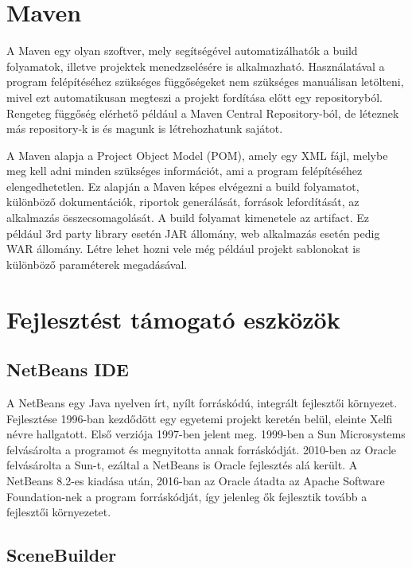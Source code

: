 \section{Maven}

A Maven egy olyan szoftver, mely segítségével automatizálhatók a build folyamatok, illetve projektek menedzselésére is alkalmazható.\cite{maven1}
Használatával a program felépítéséhez szükséges függőségeket nem szükséges manuálisan letölteni, mivel ezt automatikusan megteszi a projekt fordítása előtt egy repositoryból.
Rengeteg függőség elérhető például a Maven Central Repository-ból, de léteznek más repository-k is és magunk is létrehozhatunk sajátot. 

A Maven alapja a Project Object Model (POM), amely egy XML fájl, melybe meg kell adni minden szükséges információt, ami a program felépítéséhez elengedhetetlen.
Ez alapján a Maven képes elvégezni a build folyamatot, különböző dokumentációk, riportok generálását, források lefordítását, az alkalmazás összecsomagolását.
A build folyamat kimenetele az artifact.
Ez például 3rd party library esetén JAR állomány, web alkalmazás esetén pedig WAR állomány.
Létre lehet hozni vele még például projekt sablonokat is különböző paraméterek megadásával. 

\section{Fejlesztést támogató eszközök}

\subsection{NetBeans IDE} 

A NetBeans egy Java nyelven írt, nyílt forráskódú, integrált fejlesztői környezet.
Fejlesztése 1996-ban kezdődött egy egyetemi projekt keretén belül, eleinte Xelfi névre hallgatott.
Első verziója 1997-ben jelent meg.
1999-ben a Sun Microsystems felvásárolta a programot és megnyitotta annak forráskódját.
2010-ben az Oracle felvásárolta a Sun-t, ezáltal a NetBeans is Oracle fejlesztés alá került.
A NetBeans 8.2-es kiadása után, 2016-ban az Oracle átadta az Apache Software Foundation-nek a program forráskódját, így jelenleg ők fejlesztik tovább a fejlesztői környezetet.

\subsection{SceneBuilder}

